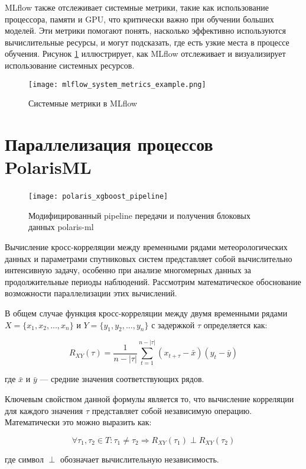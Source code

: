 MLflow также отслеживает системные метрики, такие как использование процессора, памяти и GPU, что критически важно при обучении больших моделей. Эти метрики помогают понять, насколько эффективно используются вычислительные ресурсы, и могут подсказать, где есть узкие места в процессе обучения. Рисунок \ref{fig:mlflow_system_metrics} иллюстрирует, как MLflow отслеживает и визуализирует использование системных ресурсов.

\begin{figure}[h!]
	\centering
	\texttt{[image: mlflow\_system\_metrics\_example.png]}
	\caption{Системные метрики в MLflow}
	\label{fig:mlflow_system_metrics}
\end{figure}

\section{Параллелизация процессов PolarisML}

\begin{figure}[!htbp]
	\centering
	\texttt{[image: polaris\_xgboost\_pipeline]}
	~\caption{Модифицированный pipeline передачи и получения блоковых данных polaris-ml}
	\label{fig:polaris_xgboost_pipeline}
\end{figure}

Вычисление кросс-корреляции между временными рядами метеорологических данных и
параметрами спутниковых систем представляет собой вычислительно интенсивную
задачу, особенно при анализе многомерных данных за продолжительные периоды
наблюдений. Рассмотрим математическое обоснование возможности параллелизации
этих вычислений.

В общем случае функция кросс-корреляции между двумя временными рядами $X =
	\{x_1, x_2, \ldots, x_n\}$ и $Y = \{y_1, y_2, \ldots, y_n\}$ с задержкой $\tau$
определяется как:

\[
	R_{XY}(\tau) = \frac{1}{n-|\tau|} \sum_{t=1}^{n-|\tau|} (x_{t+\tau} - \bar{x})(y_t - \bar{y})
\]

где $\bar{x}$ и $\bar{y}$ — средние значения соответствующих рядов.

Ключевым свойством данной формулы является то, что вычисление корреляции для
каждого значения $\tau$ представляет собой независимую операцию. Математически
это можно выразить как:

\[
	\forall \tau_1, \tau_2 \in T: \tau_1 \neq \tau_2 \Rightarrow R_{XY}(\tau_1) \perp R_{XY}(\tau_2)
\]

где символ $\perp$ обозначает вычислительную независимость.

